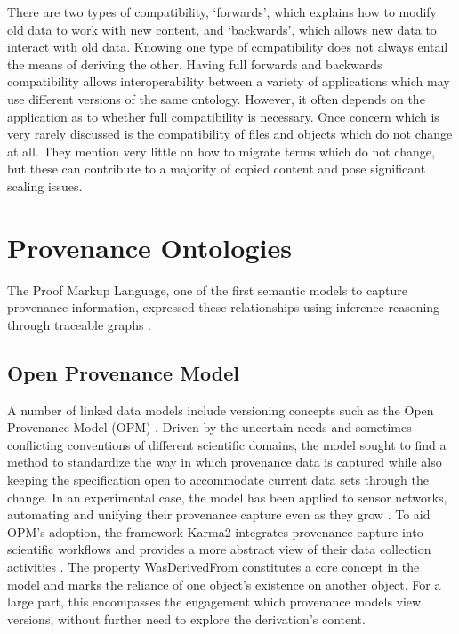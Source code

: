 There are two types of compatibility, `forwards', which explains how to modify old data to work with new content, and `backwards', which allows new data to interact with old data.
Knowing one type of compatibility does not always entail the means of deriving the other.
Having full forwards and backwards compatibility allows interoperability between a variety of applications which may use different versions of the same ontology.
However, it often depends on the application as to whether full compatibility is necessary.
Once concern which is very rarely discussed is the compatibility of files and objects which do not change at all.
They mention very little on how to migrate terms which do not change, but these can contribute to a majority of copied content and pose significant scaling issues.

\section{Provenance Ontologies}

The Proof Markup Language, one of the first semantic models to capture provenance information, expressed these relationships using inference reasoning through traceable graphs \cite{daSilva2006381}.

\subsection{Open Provenance Model}

A number of linked data models include versioning concepts such as the Open Provenance Model (OPM) \cite{moreau2008open}.
Driven by the uncertain needs and sometimes conflicting conventions of different scientific domains, the model sought to find a method to standardize the way in which provenance data is captured while also keeping the specification open to accommodate current data sets through the change.
In an experimental case, the model has been applied to sensor networks, automating and unifying their provenance capture even as they grow \cite{5478496}.
To aid OPM's adoption, the framework Karma2 integrates provenance capture into scientific workflows and provides a more abstract view of their data collection activities \cite{simmhan2010karma2}.
The property WasDerivedFrom constitutes a core concept in the model and marks the reliance of one object's existence on another object.
For a large part, this encompasses the engagement which provenance models view versions, without further need to explore the derivation's content.

